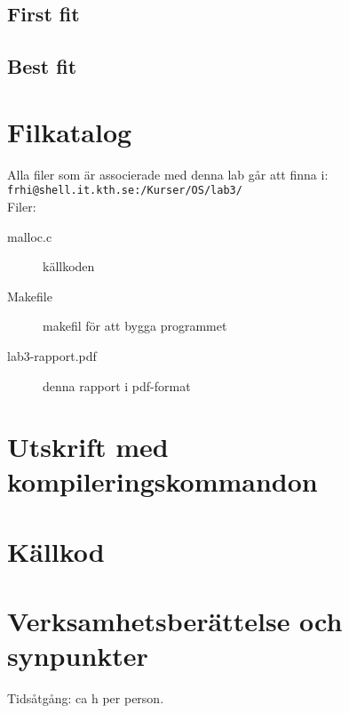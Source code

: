 \documentclass[a4paper]{article}
\begin{document}


\subsection*{First fit}

\subsection*{Best fit}

\section*{Filkatalog}
Alla filer som är associerade med denna lab går att finna i:\\
\texttt{frhi@shell.it.kth.se:/Kurser/OS/lab3/}
\\
Filer:
\begin{description}
\item[malloc.c] källkoden
\item[Makefile] makefil för att bygga programmet
\item[lab3-rapport.pdf] denna rapport i pdf-format
\end{description}

\section*{Utskrift med kompileringskommandon}
%

\section*{Källkod}
%

\section*{Verksamhetsberättelse och synpunkter}
Tidsåtgång: ca h per person.
\end{document}
